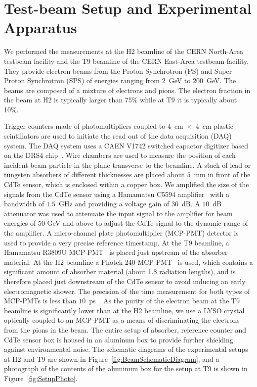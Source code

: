 \section{Test-beam Setup and Experimental Apparatus }
\label{sec:tbeam}

We performed the measurements at the H2 beamline of the CERN North-Area testbeam facility
and the T9 beamline of the CERN East-Area testbeam facility. They provide electron beams 
from the Proton Synchrotron (PS) and Super Proton Synchrotron (SPS)
of energies ranging from $2$~GeV to $200$~GeV. The beams are composed of 
a mixture of electrons and pions. The electron fraction in the beam at H2 is typically larger than 75\%
while at T9 it is typically about 10\%. 

Trigger counters made of photomultipliers coupled to $4$~$\mathrm{cm}$~$\times$~$4$~$\mathrm{cm}$ 
plastic scintillators are used 
to initiate the read out of the data acquisition (DAQ) system. The DAQ system
uses a CAEN V1742 switched capactor digitizer based on the DRS4 chip~\cite{DRS4}. Wire chambers
are used to measure the position of each incident beam particle in the plane transverse
to the beamline. A stack of lead or tungsten absorbers of different thicknesses are 
placed about $5$~mm in front of the CdTe sensor, which is 
enclosed within a copper box. We amplified the size of the
signals from the CdTe sensor using a Hamamatsu C5594 amplifier~\cite{HamaAmpDataSheet} with a bandwidth of
$1.5$~GHz and providing a voltage gain of $36$~dB. A $10$~dB attenuator was used to attenuate the input signal 
to the amplifier for beam energies of 50 GeV and above to adjust the CdTe signal to the dynamic range of the amplifier. 
A micro-channel plate photomultiplier (MCP-PMT)
detector is used to provide a very precise reference timestamp. At the T9 beamline,
a Hamamatsu R3809U MCP-PMT~\cite{HamaMCPDataSheet} is placed just upstream of the absorber material. 
At the H2 beamline a Photek 240 MCP-PMT~\cite{PhotekDataSheet} is used, which contains a significant 
amount of absorber material (about 1.8 radiation lengths), and is therefore placed 
just downstream of the CdTe sensor to avoid inducing an early electromagnetic shower.
The precision of the time measurement for both types of MCP-PMTs is less than 
$10$~ps~\cite{MCPShowerMaxPaper,Anderson:2015gha}. As the purity of the electron beam at the T9 beamline is
significantly lower than at the H2 beamline, we use a LYSO crystal
optically coupled to an MCP-PMT as a means of discriminating the electrons from the pions
in the beam. The entire setup of absorber, reference counter and CdTe sensor box is housed in an aluminum
box to provide further shielding against environmental noise.
The schematic diagrams of the experimental setups at H2 and T9 
are shown in Figure~\ref{fig:BeamSchematicDiagram}, and a photograph
of the contents of the aluminum box for the setup at T9 is shown in 
Figure~\ref{fig:SetupPhoto}.


